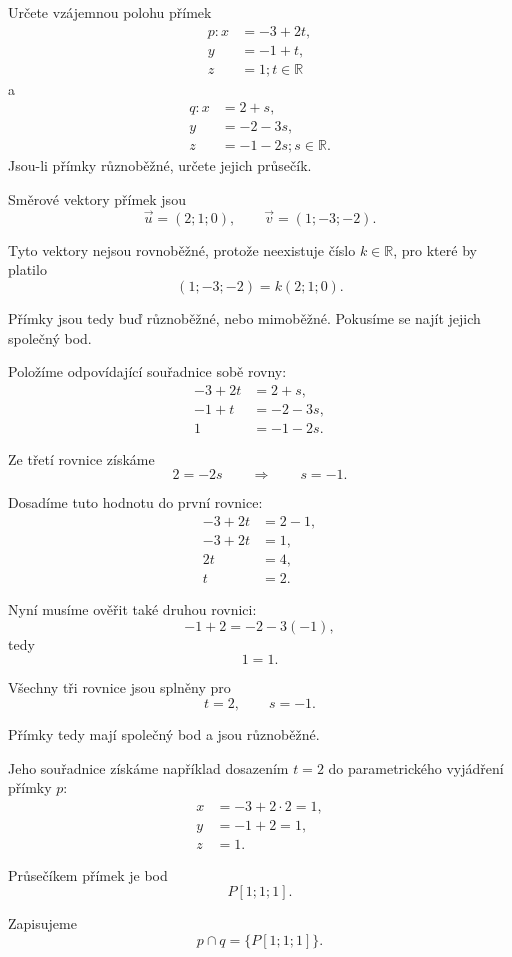 \begin{example}
    \label{exa:Intersecting_parametric_lines_space}
    Určete vzájemnou polohu přímek
    \[
        \begin{aligned}
            p: x&=-3+2t,\\
            y&=-1+t,\\
            z&=1; t\in\mathbb{R}
        \end{aligned}
    \]
    a
    \[
        \begin{aligned}
            q: x&=2+s,\\
            y&=-2-3s,\\
            z&=-1-2s; s\in\mathbb{R}.
        \end{aligned}
    \]
    Jsou-li přímky různoběžné, určete jejich průsečík.

    Směrové vektory přímek jsou
    \[
        \vec{u}=(2;1;0),
        \qquad
        \vec{v}=(1;-3;-2).
    \]

    Tyto vektory nejsou rovnoběžné, protože neexistuje číslo
    $k\in\mathbb{R}$, pro které by platilo
    \[
        (1;-3;-2)=k(2;1;0).
    \]

    Přímky jsou tedy buď různoběžné, nebo mimoběžné.
    Pokusíme se najít jejich společný bod.

    Položíme odpovídající souřadnice sobě rovny:
    \begin{align*}
        -3+2t &= 2+s,\\
        -1+t &= -2-3s,\\
        1 &= -1-2s.
    \end{align*}

    Ze třetí rovnice získáme
    \[
        2=-2s
        \qquad\Rightarrow\qquad
        s=-1.
    \]

    Dosadíme tuto hodnotu do první rovnice:
    \begin{align*}
        -3+2t &= 2-1,\\
        -3+2t &= 1,\\
        2t &= 4,\\
        t &= 2.
    \end{align*}

    Nyní musíme ověřit také druhou rovnici:
    \[
        -1+2
        =
        -2-3(-1),
    \]
    tedy
    \[
        1=1.
    \]

    Všechny tři rovnice jsou splněny pro
    \[
        t=2,
        \qquad
        s=-1.
    \]

    Přímky tedy mají společný bod a jsou různoběžné.

    Jeho souřadnice získáme například dosazením $t=2$
    do parametrického vyjádření přímky $p$:
    \begin{align*}
        x&=-3+2\cdot2=1,\\
        y&=-1+2=1,\\
        z&=1.
    \end{align*}

    Průsečíkem přímek je bod
    \[
        P[1;1;1].
    \]

    Zapisujeme
    \[
        p\cap q=\{P[1;1;1]\}.
    \]
\end{example}

